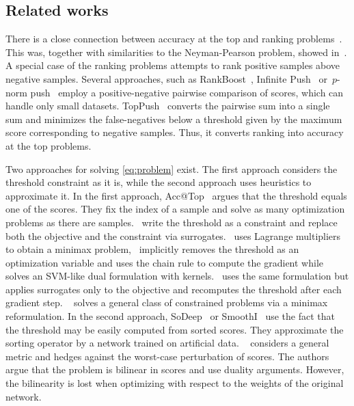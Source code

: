 \subsection{Related works}

There is a close connection between accuracy at the top and ranking problems~\cite{batmaz2019review,werner2019review}. This was, together with similarities to the Neyman-Pearson problem, showed in~\cite{adam2021general}. A special case of the ranking problems attempts to rank positive samples above negative samples. Several approaches, such as RankBoost~\cite{freund2003efficient}, Infinite Push~\cite{agarwal2011infinite} or~$p$-norm push~\cite{rudin2009pnorm} employ a positive-negative pairwise comparison of scores, which can handle only small datasets. TopPush~\cite{li2014top} converts the pairwise sum into a single sum and minimizes the false-negatives below a threshold given by the maximum score corresponding to negative samples. Thus, it converts ranking into accuracy at the top problems.

Two approaches for solving \eqref{eq:problem} exist. The first approach considers the threshold constraint as it is, while the second approach uses heuristics to approximate it. In the first approach, Acc@Top~\cite{boyd2012accuracy} argues that the threshold equals one of the scores. They fix the index of a sample and solve as many optimization problems as there are samples.~\cite{eban2017scalable,adam2021general,kumar2021implicit} write the threshold as a constraint and replace both the objective and the constraint via surrogates.~\cite{eban2017scalable} uses Lagrange multipliers to obtain a minimax problem,~\cite{mackey2018constrained} implicitly removes the threshold as an optimization variable and uses the chain rule to compute the gradient while~\cite{macha2020nonlinear} solves an SVM-like dual formulation with kernels.~\cite{grill2016learning} uses the same formulation but applies surrogates only to the objective and recomputes the threshold after each gradient step. \TFCO~\cite{cotter2019optimization} solves a general class of constrained problems via a minimax reformulation. In the second approach, SoDeep~\cite{engilberge2019sodeep} or SmoothI~\cite{thonet2021smoothi} use the fact that the threshold may be easily computed from sorted scores. They approximate the sorting operator by a network trained on artificial data. \APPerf~\cite{fathony2019ap} considers a general metric and hedges against the worst-case perturbation of scores. The authors argue that the problem is bilinear in scores and use duality arguments. However, the bilinearity is lost when optimizing with respect to the weights of the original network. 

